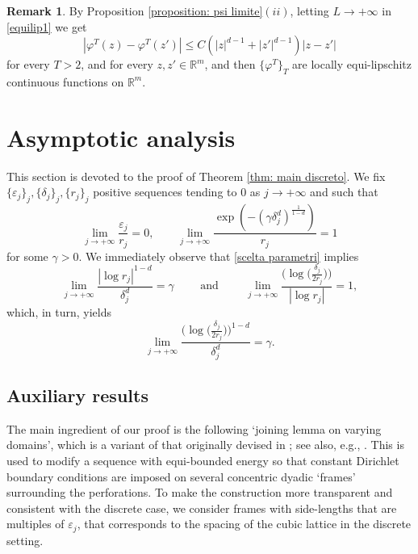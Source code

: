 \documentclass{article}
\theoremstyle{plain}
\theoremstyle{definition}
\newtheorem{remark}[theorem]{Remark}
\def\e{\varepsilon}
\def\rr{{\mathbb R}}
\newcommand{\f}{\varphi}
\newcommand{\ej}{\varepsilon_j}
\newcommand{\rj}{r_j}
\newcommand{\dej}{\delta_j}
\numberwithin{equation}{section}
\begin{document}
\begin{remark}
By Proposition \ref{proposition: psi limite}$(ii)$, letting $L\to+\infty$ in \eqref{equilip1} we get 
    \begin{equation}\label{equilip2}
     |\f^T(z)-\f^T(z')|\leq C(|z|^{d-1}+|z'|^{d-1})|z-z'|  
    \end{equation}  
for every $T>2$, and for every $z,z'\in \rr^m$, and then $\{\f^T\}_T$ are locally equi-lipschitz continuous functions on $\rr^m$.
\end{remark}


\section{Asymptotic analysis}
\label{Sec: asymptotic analysis}

This section is devoted to the proof of Theorem \ref{thm: main discreto}. We fix $\{\e_j\}_j, \{\dej\}_j, \{\rj\}_j$ positive sequences tending to $0$ as $j\to+\infty$ and such that
\begin{equation}\label{scelta parametri}
    \lim_{j\to+\infty} \frac{\ej}{\rj}=0, \qquad \lim_{j\to+\infty}\frac{\exp(-(\gamma\dej^d)^{\frac{1}{1-d}})}{\rj}=1
\end{equation}
for some $\gamma>0$.
We immediately observe that \eqref{scelta parametri} implies
\begin{equation*}
    \lim_{j\to+\infty}\frac{|\log \rj|^{1-d}}{\dej^d}=\gamma \qquad \text{ and } \qquad \lim_{j\to+\infty}\frac{\bigl(\log\bigl(\frac{\dej}{2\rj}\bigr)\bigr)}{|\log \rj|}=1,
\end{equation*}
which, in turn, yields \begin{equation}\label{dej^d}
\lim_{j\to+\infty}\frac{\bigl(\log\bigl(\frac{\dej}{2\rj}\bigr)\bigr)^{1-d}}{\dej^d}=\gamma.
\end{equation}


\subsection{Auxiliary results}

The main ingredient of our proof is the following `joining lemma on varying domains', which is a variant of that originally devised in \cite{AnsBraJMPA}; see also, e.g., \cite{Sig-dis}. This is used to modify a sequence with equi-bounded energy so that constant Dirichlet boundary conditions are imposed on several concentric dyadic `frames' surrounding the perforations. To make the construction more transparent and consistent with the discrete case, we consider frames with side-lengths that are multiples of $\ej$, that corresponds to the spacing of the cubic lattice in the discrete setting.
\end{document}
